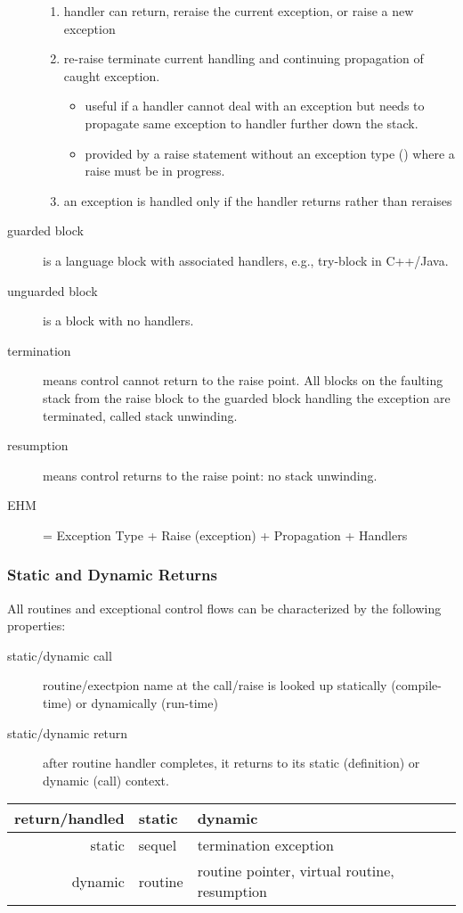 \documentclass[12pt]{article}
\begin{document}
\begin{description}
\begin{enumerate}
\item handler can return, reraise the current exception, or raise a new exception
\item re-raise terminate current handling and continuing propagation of caught exception.
\begin{itemize}
\item useful if a handler cannot deal with an exception but needs to propagate same exception to handler further down the stack.
\item provided by a raise statement without an exception type () where a raise must be in progress.
\end{itemize}
\item an exception is handled only if the handler returns rather than reraises
\end{enumerate}
\item[guarded block] is a language block with associated handlers, e.g., try-block in C++/Java.
\item[unguarded block] is a block with no handlers.
\item[termination] means control cannot return to the raise point. All blocks on the faulting stack from the raise block to the guarded block handling the exception are terminated, called stack unwinding.
\item[resumption] means control returns to the raise point: no stack unwinding.
\item[EHM] = Exception Type + Raise (exception) + Propagation + Handlers
\end{description}

\subsubsection{Static and Dynamic Returns}
All routines and exceptional control flows can be characterized by the following properties:
\begin{description}
\item[static/dynamic call] routine/exectpion name at the call/raise is looked up statically (compile-time) or dynamically (run-time)
\item[static/dynamic return] after routine handler completes, it returns to its static (definition) or dynamic (call) context.
\end{description}

\begin{table}[ht]
\centering
\begin{tabular}{r||l|l}
  return/handled & static  & dynamic \\
  \hline \hline
  static         & sequel  & termination exception \\ \hline
  dynamic        & routine & routine pointer, virtual routine, resumption \\
  \end{tabular}
\end{table}
\end{document}
